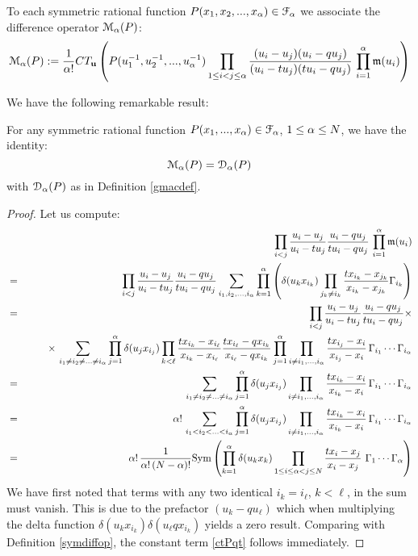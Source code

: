 \begin{defn}\label{malphadef}
To each symmetric rational function $P(x_1,x_2,...,x_{\alpha})\in {\mathcal F}_{\alpha}$ we associate the difference operator
${\mathcal M}_{\alpha}(P)$:
\begin{equation}
{\mathcal M}_{\alpha}(P):=\frac{1}{{\alpha}!}CT_{\mathbf u}\left( P(u_1^{-1},u_2^{-1},...,u_{\alpha}^{-1}) \prod_{1\leq i<j\leq {\alpha}} 
\frac{(u_i-u_j)(u_i-q u_j)}{(u_i-t u_j)(t u_i-q u_j)}\, \prod_{i=1}^{\alpha} {\mathfrak m}(u_i)\right) \label{ctdiffop}
\end{equation}
\end{defn}

We have the following remarkable result:

\begin{thm}\label{mainthm}
For any symmetric rational function $P(x_1,...,x_{\alpha})\in {\mathcal F}_{\alpha}$, $1\leq {\alpha}\leq N$, we have the identity:
\begin{equation}
{\mathcal M}_{\alpha}(P)= {\mathcal D}_{\alpha}(P) \label{ctPqt}
\end{equation}
with ${\mathcal D}_{\alpha}(P)$ as in Definition \ref{gmacdef}.
\end{thm}
\begin{proof}
Let us compute:
\begin{eqnarray*}
&&\prod_{i<j}  \frac{u_i-u_j}{u_i-t u_j}\frac{u_i-q u_j}{t u_i-q u_j} \, \prod_{i=1}^\al {\mathfrak m}(u_i)\\
&=& \prod_{i<j} \frac{u_i-u_j}{u_i-t u_j}\frac{u_i-q u_j}{t u_i-q u_j} \sum_{i_1,i_2,...,i_\al} 
\prod_{k=1}^\al \left(\delta(u_k x_{i_k}) 
\prod_{j_k\neq i_k}\frac{t x_{i_k}-x_{j_k}}{x_{i_k}-x_{j_k}} \Gamma_{i_k}\right) \\
&=& \prod_{i<j} \frac{u_i-u_j}{u_i-t u_j}\frac{u_i-q u_j}{t u_i-q u_j} \times \\
&&\qquad \times\, \sum_{i_1\neq i_2\neq ...\neq i_\al} 
\prod_{j=1}^\al \delta(u_j x_{i_j}) 
\prod_{k<\ell }\frac{t x_{i_k}- x_{i_\ell}}{x_{i_k}- x_{i_\ell}}\frac{t x_{i_\ell}-q x_{i_k}}{x_{i_\ell}- q x_{i_k}} 
\prod_{j=1}^\al \prod_{i\neq i_1,...,i_\al}\frac{t x_{i_j}-x_i}{x_{i_j}-x_i}\, \Gamma_{i_1}\cdots \Gamma_{i_\al}
\\
&=&\sum_{i_1\neq i_2\neq ...\neq i_\al} 
\prod_{j=1}^\al \delta(u_j x_{i_j}) \prod_{i\neq i_1,...,i_\al} \frac{t x_{i_k}-x_i}{x_{i_k}-x_i}
\, \Gamma_{i_1}\cdots \Gamma_{i_\al}\\
&=&\al!\, \sum_{i_1<i_2< ...<i_\al} 
\prod_{j=1}^\al \delta(u_j x_{i_j}) \prod_{i\neq i_1,...,i_\al} \frac{t x_{i_k}-x_i}{x_{i_k}-x_i}
\, \Gamma_{i_1}\cdots \Gamma_{i_\al}\\
&=&\al!\,  \frac{1}{\al!\,(N-\al)!}{\rm Sym}\left( \prod_{k=1}^\al \delta(u_k x_{k})  
\prod_{1\leq i\leq \al<j\leq N} \frac{t x_{i}-x_j}{x_{i}-x_j} \ 
\Gamma_1 \cdots \Gamma_\al \right)
\end{eqnarray*}
We have first noted that terms with any two identical $i_k=i_\ell$, $k<\ell$, in the sum must vanish. 
This is due to the prefactor $(u_{k}-q u_{\ell})$ which when multiplying the delta function 
$\delta(u_k x_{i_k})\delta(u_\ell q x_{i_k})$ yields a zero result.
Comparing with Definition \ref{symdiffop}, 
the constant term \eqref{ctPqt} follows immediately.
\end{proof}


